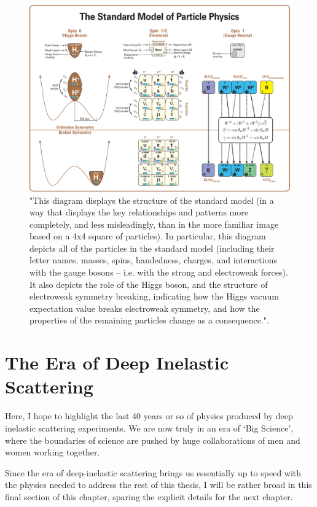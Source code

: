 \begin{figure}[ht]
	\centering
	\includegraphics[width=\linewidth]{./figures/standard_model_complete_lowres.png}
	\caption{
		"This diagram displays the structure of the standard model (in a way that
		displays the key relationships and patterns more completely, and less
		misleadingly, than in the more familiar image based on a 4x4 square of
		particles). In particular, this diagram depicts all of the particles in the
		standard model (including their letter names, masses, spins, handedness,
		charges, and interactions with the gauge bosons -- i.e. with the strong and
		electroweak forces). It also depicts the role of the Higgs boson, and the
		structure of electroweak symmetry breaking, indicating how the Higgs vacuum
		expectation value breaks electroweak symmetry, and how the properties of the
		remaining particles change as a consequence."\cite{Boyle2014}.
	}
	\label{fig:standardmodel}
\end{figure}


\clearpage
\section{The Era of Deep Inelastic Scattering}

Here, I hope to highlight the last 40 years or so of physics produced by deep
inelastic scattering experiments. We are now truly in an era of `Big Science',
where the boundaries of science are pushed by huge collaborations of men and
women working together. 

Since the era of deep-inelastic scattering brings us essentially up to speed
with the physics needed to address the rest of this thesis, I will be rather
broad in this final section of this chapter, sparing the explicit details for
the next chapter.

